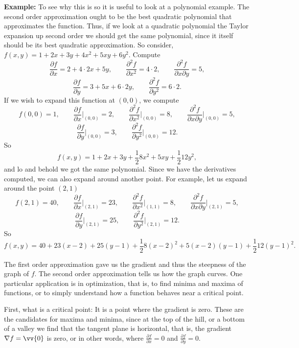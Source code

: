 \documentclass[12pt]{article}
\begin{document}
\medskip

\textbf{Example:}
To see why this is so it is useful to look at a polynomial example.  The
second order approximation ought to be the best quadratic polynomial that
approximates the function.  Thus, if we look at a quadratic polynomial the
Taylor expansion up second order we should get the same polynomial, since it
itself should be its best quadratic approximation.
So consider, $f(x,y) = 1 + 2x + 3y + 4x^2+ 5xy + 6y^2$.  Compute
$$
\frac{\partial f}{\partial x} = 2 + 4 \cdot 2x + 5y, \qquad
\frac{\partial^2 f}{\partial x^2} = 4 \cdot 2, \qquad
\frac{\partial^2 f}{\partial x \partial y} = 5 ,
$$
$$
\frac{\partial f}{\partial y} = 3 + 5x + 6 \cdot 2y, \qquad
\frac{\partial^2 f}{\partial y^2} = 6 \cdot 2 .
$$
If we wish to expand this function at $(0,0)$, we compute
$$
f(0,0) = 1, \qquad
\frac{\partial f}{\partial x}\Big|_{(0,0)} = 2, \qquad
\frac{\partial^2 f}{\partial x^2}\Big|_{(0,0)} = 8, \qquad
\frac{\partial^2 f}{\partial x \partial y}\Big|_{(0,0)} = 5 ,
$$
$$
\frac{\partial f}{\partial y}\Big|_{(0,0)} = 3, \qquad
\frac{\partial^2 f}{\partial y^2}\Big|_{(0,0)} = 12 .
$$
So
\begin{equation*}
f(x,y) = 1 + 2 x + 3 y + \frac{1}{2} 8 x^2 + 5 xy + \frac{1}{2} 12 y^2 ,
\end{equation*}
and lo and behold we got the same polynomial.
Since we have the derivatives computed, we can also expand around another
point.  For example, let us expand around the point $(2,1)$
$$
f(2,1) = 40, \qquad
\frac{\partial f}{\partial x}\Big|_{(2,1)} = 23, \qquad
\frac{\partial^2 f}{\partial x^2}\Big|_{(1,1)} = 8, \qquad
\frac{\partial^2 f}{\partial x \partial y}\Big|_{(2,1)} = 5 ,
$$
$$
\frac{\partial f}{\partial y}\Big|_{(2,1)} = 25, \qquad
\frac{\partial^2 f}{\partial y^2}\Big|_{(2,1)} = 12 .
$$
So
\begin{equation*}
f(x,y) = 40 + 23(x-2) + 25 (y-1) + \frac{1}{2} 8 (x-2)^2 + 5 (x-2)(y-1) +
\frac{1}{2} 12 (y-1)^2 .
\end{equation*}

\medskip

The first order approximation gave us the gradient and thus the
steepness of the graph of $f$.  The second order approximation tells us how
the graph curves.  One particular application is in optimization, that is,
to find minima and maxima of functions, or to simply understand how a
function behaves near a critical point.

First, what is a critical point:  It is a point where the gradient is zero.
These are the candidates for maxima and minima, since at the top of the
hill, or a bottom of a valley we find that the tangent plane is horizontal,
that is, the gradient $\nabla f = \vv{0}$ is zero,
or in other words, where
$\frac{\partial f}{\partial x} = 0$ and
$\frac{\partial f}{\partial y} = 0$.
\end{document}
